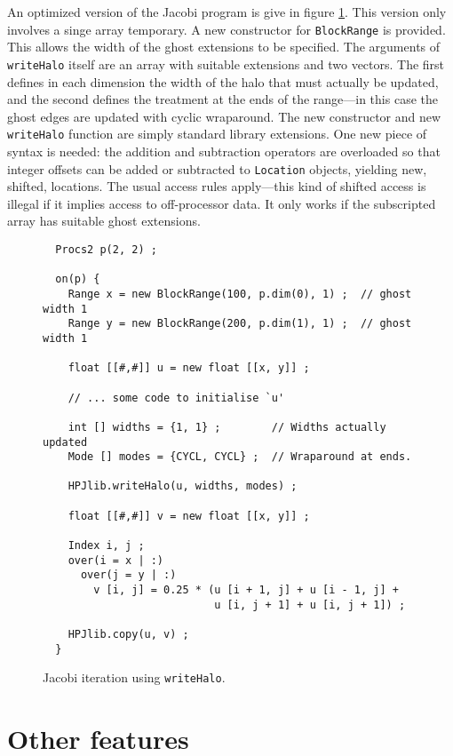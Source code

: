 An optimized version of the Jacobi program is give in figure
\ref{JacobiGhost}.  This version only involves a singe array temporary.
A new constructor for {\tt BlockRange} is provided.  This
allows the width of the ghost extensions to be specified.
The arguments of {\tt writeHalo} itself are an array with
suitable extensions and two vectors.  The first defines in each dimension
the width of the halo that must actually be updated, and the
second defines the treatment at the ends of the range---in
this case the ghost edges are updated with cyclic wraparound.
The new constructor and new {\tt writeHalo} function are simply
standard library extensions.  One new piece of syntax is needed:
the addition and subtraction operators are overloaded so that
integer offsets can be added or subtracted to {\tt Location}
objects, yielding new, shifted, locations.  The
usual access rules apply---this kind of shifted access is illegal
if it implies access to off-processor data.  It only works if
the subscripted array has suitable ghost extensions.

\begin{figure}[btp]
\small
\begin{verbatim}
  Procs2 p(2, 2) ;

  on(p) {
    Range x = new BlockRange(100, p.dim(0), 1) ;  // ghost width 1
    Range y = new BlockRange(200, p.dim(1), 1) ;  // ghost width 1

    float [[#,#]] u = new float [[x, y]] ;

    // ... some code to initialise `u'

    int [] widths = {1, 1} ;        // Widths actually updated
    Mode [] modes = {CYCL, CYCL} ;  // Wraparound at ends.

    HPJlib.writeHalo(u, widths, modes) ;

    float [[#,#]] v = new float [[x, y]] ;

    Index i, j ;
    over(i = x | :)
      over(j = y | :)
        v [i, j] = 0.25 * (u [i + 1, j] + u [i - 1, j] +
                           u [i, j + 1] + u [i, j + 1]) ;

    HPJlib.copy(u, v) ;
  }
\end{verbatim}
\normalsize
\caption{\label{JacobiGhost}Jacobi iteration using {\tt writeHalo}.}
\end{figure}

\section{Other features}

